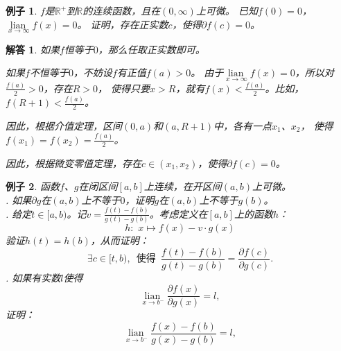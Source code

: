 \documentclass[12pt,UTF8]{ctexbook}
\newcommand{\lian}[1]{
    \underset{#1}{\operatorname{lian}\,}
}
\newtheorem{ex}{例子}[section]
\newtheorem*{so}{解答}
\begin{document}
\begin{ex}\label{ex:3-2-4-20}
    $f$是$\mathbb{R}^+$到$\mathbb{R}$的连续函数，且在$(0,\infty)$上可微。
    已知$f(0) = 0$，$\lian{x\to\infty} f(x) = 0$。
    证明，存在正实数$c$，使得$\partial f(c) = 0$。
\end{ex}

\begin{so}
    如果$f$恒等于$0$，那么任取正实数即可。

    如果$f$不恒等于$0$，不妨设$f$有正值$f(a) > 0$。
    由于$\lian{x\to\infty} f(x) = 0$，所以对$\frac{f(a)}{2} > 0$，存在$R > 0$，
    使得只要$x > R$，就有$f(x) < \frac{f(a)}{2}$。比如，$f(R+1) < \frac{f(a)}{2}$。

    因此，根据介值定理，区间$(0, a)$和$(a, R+1)$中，各有一点$x_1$、$x_2$，
    使得$f(x_1) = f(x_2) = \frac{f(a)}{2}$。

    因此，根据微变零值定理，存在$c\in(x_1, x_2)$，使得$\partial f(c) = 0$。

\end{so}

\begin{ex}\label{ex:3-2-4-30}  %
    函数$f$、$g$在闭区间$[a, b]$上连续，在开区间$(a, b)$上可微。\\
    . 如果$\partial g$在$(a, b)$上不等于$0$，证明$g$在$(a, b)$上不等于$g(b)$。\\
    . 给定$t\in[a, b)$。记$v = \frac{f(t) - f(b)}{g(t) - g(b)}$。考虑定义在$[a,b]$上的函数$h$：
    $$ h: \,\, x \mapsto f(x) - v\cdot g(x)$$
    验证$h(t) = h(b)$，从而证明：
    $$ \exists c \in [t, b), \,\,\, \mbox{使得} \,\,\, \frac{f(t) - f(b)}{g(t) - g(b)} = \frac{\partial f(c)}{\partial g(c)}. $$
    . 如果有实数$l$使得
    $$ \lian{x\to b^-} \frac{\partial f(x)}{\partial g(x)} = l, $$
    证明：
    $$ \lian{x\to b^-}  \frac{f(x) - f(b)}{g(x) - g(b)} = l, $$
\end{ex}
\end{document}
